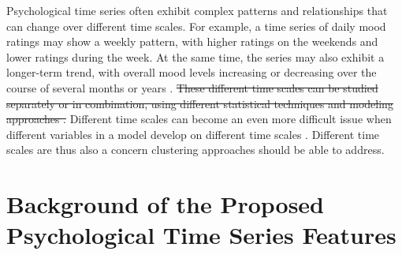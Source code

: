\documentclass[man, 12pt, a4paper, mask, floatsintext]{apa7}
\theoremstyle{break}
\theoremstyle{plain}
\begin{document}
Psychological time series often exhibit complex patterns and relationships that can change over different time scales. For example, a time series of daily mood ratings may show a weekly pattern, with higher ratings on the weekends and lower ratings during the week. At the same time, the series may also exhibit a longer-term trend, with overall mood levels increasing or decreasing over the course of several months or years \citep[e.g.,][]{Ram2014}. \sout{These different time scales can be studied separately or in combination, using different statistical techniques and modeling approaches \citep[][]{bertenthal2007, jeronimus2019a}.} Different time scales can become an even more difficult issue when different variables in a model develop on different time scales \citep{bringmann2022b}. Different time scales are thus also a concern clustering approaches should be able to address.



\section{Background of the Proposed Psychological Time Series Features}
\label{app:FeatureBackground}
\end{document}
